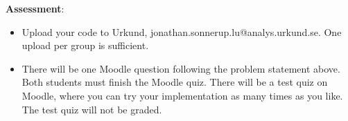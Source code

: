 \documentclass{article}
\begin{document}
\begin{description}
{				\textbf{Assessment}:
				\begin{itemize}
					\item Upload your code to Urkund, jonathan.sonnerup.lu@analys.urkund.se.
					One upload per group is sufficient.
					
					\item There will be one Moodle question following the problem statement above. 
					Both students must finish the Moodle quiz.
					There will be a test quiz on Moodle, where you can try your implementation as many times as you like. The test quiz will not be graded.
				\end{itemize}
			}
			
		\end{description}
		
	
\end{document}
